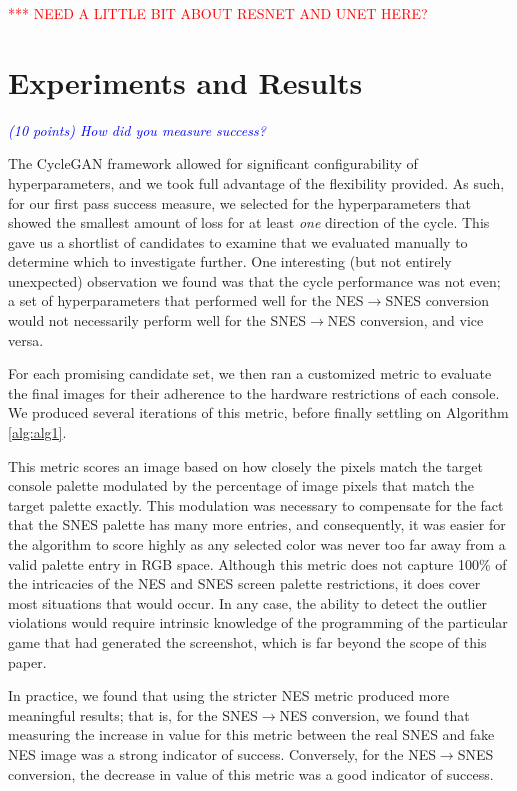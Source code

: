 \documentclass[10pt,twocolumn,letterpaper]{article}
\begin{document}
\textcolor{red}{*** NEED A LITTLE BIT ABOUT RESNET AND UNET HERE?}

\section{Experiments and Results}

\textit{\textcolor{blue}{(10 points) How did you measure success?}}

The CycleGAN framework allowed for significant configurability of hyperparameters, and we took full advantage of the flexibility provided. As such, for our first pass success measure, we selected for the hyperparameters that showed the smallest amount of loss for at least \textit{one} direction of the cycle. This gave us a shortlist of candidates to examine that we evaluated manually to determine which to investigate further. One interesting (but not entirely unexpected) observation we found was that the cycle performance was not even; a set of hyperparameters that performed well for the NES$\rightarrow$SNES conversion would not necessarily perform well for the SNES$\rightarrow$NES conversion, and vice versa. 

For each promising candidate set, we then ran a customized metric to evaluate the final images for their adherence to the hardware restrictions of each console. We produced several iterations of this metric, before finally settling on Algorithm \ref{alg:alg1}. 

This metric scores an image based on how closely the pixels match the target console palette modulated by the percentage of image pixels that match the target palette exactly. This modulation was necessary to compensate for the fact that the SNES palette has many more entries, and consequently, it was easier for the algorithm to score highly as any selected color was never too far away from a valid palette entry in RGB space. Although this metric does not capture 100\% of the intricacies of the NES and SNES screen palette restrictions, it does cover most situations that would occur. In any case, the ability to detect the outlier violations would require intrinsic knowledge of the programming of the particular game that had generated the screenshot, which is far beyond the scope of this paper.

In practice, we found that using the stricter NES metric produced more meaningful results; that is, for the SNES$\rightarrow$NES conversion, we found that measuring the increase in value for this metric between the real SNES and fake NES image was a strong indicator of success. Conversely, for the NES$\rightarrow$SNES conversion, the decrease in value of this metric was a good indicator of success.
\end{document}
